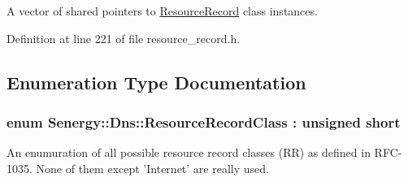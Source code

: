 A vector of shared pointers to \hyperlink{class_senergy_1_1_dns_1_1_resource_record}{Resource\-Record} class instances. 



Definition at line 221 of file resource\-\_\-record.\-h.



\subsection{Enumeration Type Documentation}
\hypertarget{namespace_senergy_1_1_dns_a953f153bc411213d621d00c1e1b3eb9d}{
\subsubsection[{Resource\-Record\-Class}]{\setlength{\rightskip}{0pt plus 5cm}enum {\bf Senergy\-::\-Dns\-::\-Resource\-Record\-Class} \-: unsigned short\hspace{0.3cm}{\ttfamily [strong]}}}\label{namespace_senergy_1_1_dns_a953f153bc411213d621d00c1e1b3eb9d}


An enumuration of all possible resource record classes (R\-R) as defined in R\-F\-C-\/1035. None of them except 'Internet' are really used. 

